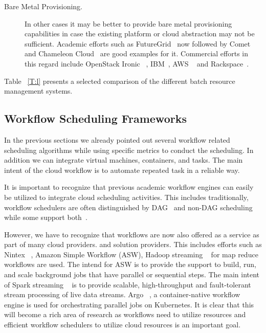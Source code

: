\documentclass[final,5p,times,twocolumn]{elsarticle}
\newcommand{\TODO}[1]{\todo[inline]{#1}}
\begin{document}
\begin{description}
\item[Bare Metal Provisioning.] In other cases it may be better to
  provide bare metal provisioning capabilities in case the
  existing platform or cloud abstraction may not be sufficient.
  Academic efforts such as FutureGrid~\cite{fox2013futuregrid} now
  followed by Comet~\cite{las-comet} and Chameleon Cloud~\cite{Chameleoncloud2019} 
  are good examples for it. Commercial
  efforts in this regard include OpenStack Ironic
 ~\cite{OpenstackIronic2019}, IBM~\cite{IBMBareMetal2019}, AWS
 ~\cite{AWS2019} and Rackspace~\cite{Rackspace2019}.

\end{description}

\TODO{THE TABLE \ref{T:l} IS INCOMPLETE}

Table ~\ref{T:l} presents a selected comparison of the different batch resource management systems.
  






\subsection{Workflow Scheduling Frameworks} 
\label{sec:workflow}

In the previous sections we already pointed out several workflow
related scheduling algorithms while using specific metrics to conduct
the scheduling. In addition we can integrate virtual machines,
containers, and tasks. The main intent of the cloud workflow is to automate
repeated task in a reliable way. 

It is important to recognize that previous academic workflow engines
can easily be utilized to integrate cloud scheduling activities. This includes
traditionally, workflow schedulers are often distinguished by
DAG~\cite{deelman2005pegasus,deelman2004pegasus,thain2005distributed}
and non-DAG scheduling while some support
both~\cite{las-karajan,las-cogkit-1,las06-workflow-book}.

However, we have to recognize that workflows are now also offered as a
service as part of many cloud providers. and solution providers. This
includes efforts such as 
Nintex ~\cite{www-nintex-wf}, Amazon Simple Workflow (ASW),
Hadoop streaming ~\cite{www-hadoop-streaming} for
map reduce workflows are used. The intend for ASW
is to provide the support to build,
run, and scale background jobs that have parallel or
sequential steps. The main intent of Spark
streaming ~\cite{www-spark-streaming} is to provide scalable,
high-throughput and fault-tolerant
stream processing of live data streams. Argo ~\cite{www-argo-wf},
a container-native workflow
engine is used for orchestrating parallel jobs on Kubernetes.
It is clear that this will become a rich area of research as workflows
need to utilize resources and efficient workflow schedulers to utilize
cloud resources is an important goal.
\end{document}
